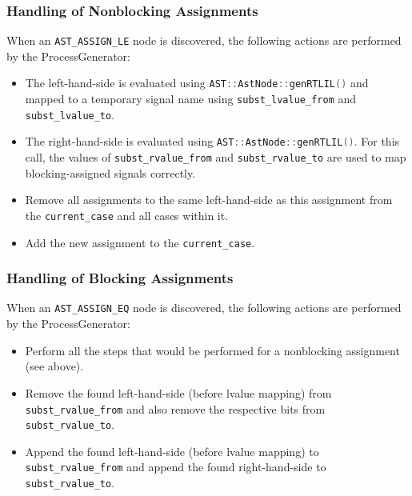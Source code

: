 \subsubsection{Handling of Nonblocking Assignments}

When an {\tt AST\_ASSIGN\_LE} node is discovered, the following actions are performed by the
ProcessGenerator:

\begin{itemize}
\item The left-hand-side is evaluated using \lstinline[language=C++]{AST::AstNode::genRTLIL()} and mapped to
a temporary signal name using \lstinline[language=C++]{subst_lvalue_from} and \lstinline[language=C++]{subst_lvalue_to}.
%
\item The right-hand-side is evaluated using \lstinline[language=C++]{AST::AstNode::genRTLIL()}. For this call,
the values of \lstinline[language=C++]{subst_rvalue_from} and \lstinline[language=C++]{subst_rvalue_to} are used to
map blocking-assigned signals correctly.
%
\item Remove all assignments to the same left-hand-side as this assignment from the \lstinline[language=C++]{current_case}
and all cases within it.
%
\item Add the new assignment to the \lstinline[language=C++]{current_case}.
\end{itemize}

\subsubsection{Handling of Blocking Assignments}

When an {\tt AST\_ASSIGN\_EQ} node is discovered, the following actions are performed by
the ProcessGenerator:

\begin{itemize}
\item Perform all the steps that would be performed for a nonblocking assignment (see above).
%
\item Remove the found left-hand-side (before lvalue mapping) from
\lstinline[language=C++]{subst_rvalue_from} and also remove the respective
bits from \lstinline[language=C++]{subst_rvalue_to}.
%
\item Append the found left-hand-side (before lvalue mapping) to \lstinline[language=C++]{subst_rvalue_from}
and append the found right-hand-side to \lstinline[language=C++]{subst_rvalue_to}.
\end{itemize}

